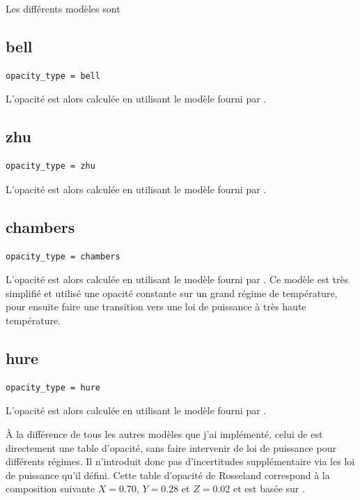 Les différents modèles sont \citep{bell1994FU, zhu2009nonsteady, chambers2009analytic, hure2000transition}

\subsection{bell}
\begin{verbatim}
opacity_type = bell
\end{verbatim}

L'opacité est alors calculée en utilisant le modèle fourni par \cite{bell1994FU}. 

\subsection{zhu}
\begin{verbatim}
opacity_type = zhu
\end{verbatim}

L'opacité est alors calculée en utilisant le modèle fourni par \cite{zhu2009nonsteady}. 

\subsection{chambers}
\begin{verbatim}
opacity_type = chambers
\end{verbatim}

L'opacité est alors calculée en utilisant le modèle fourni par \cite{chambers2009analytic}. Ce modèle est très simplifié et utilisé une opacité constante sur un grand régime de température, pour ensuite faire une transition vers une loi de puissance à très haute température.

\subsection{hure}
\begin{verbatim}
opacity_type = hure
\end{verbatim}

L'opacité est alors calculée en utilisant le modèle fourni par \cite{hure2000transition}. 

À la différence de tous les autres modèles que j'ai implémenté, celui de \cite{hure2000transition} est directement une table d'opacité, sans faire intervenir de loi de puissance pour différents régimes. Il n'introduit donc pas d'incertitudes supplémentaire via les loi de puissance qu'il défini. Cette table
d'opacité de Rosseland correspond à la composition suivante $X=0.70$, $Y=0.28$ et $Z=0.02$ et est basée sur
\cite{seaton1994opacities, alexander1994low, henning1996dust}.

